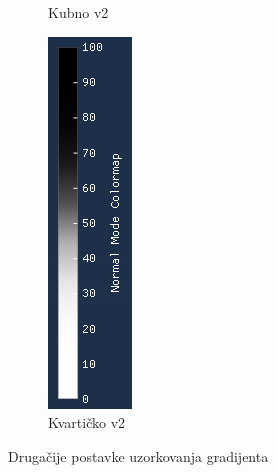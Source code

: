 \documentclass[times, utf8, diplomski]{fer}
\begin{document}
\begin{figure} [H]
\begin{subfigure}[h]{0.16\textwidth}
         \caption{Kubno v2}
         \label{fig:cubic_symmetrical_legend}
     \end{subfigure}
     \hfill
     \begin{subfigure}[h]{0.16\textwidth}
         \centering
         \includegraphics[width=\textwidth]{quartic_symmetrical_colormap.png}
         \caption{Kvartičko v2}
         \label{fig:quartic_symmetrical_legend}
     \end{subfigure}
        \caption{Drugačije postavke uzorkovanja gradijenta}
        \label{fig:colormap-legends}
\end{figure}
\end{document}
